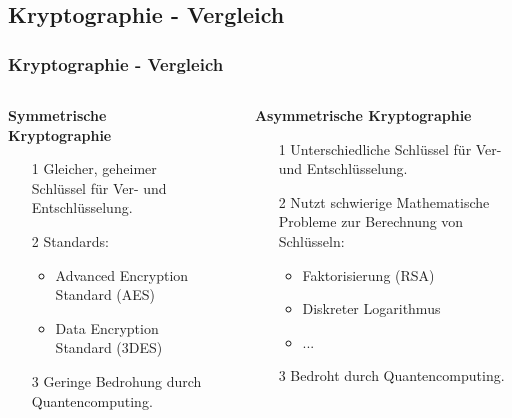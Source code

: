 \documentclass{beamer}
\begin{document}
\subsection{Kryptographie - Vergleich}
\begin{frame}
\frametitle{Kryptographie - Vergleich}

\begin{columns}[T] %

\begin{column}{.48\textwidth} %
\textbf{Symmetrische Kryptographie}
\begin{enumerate}
    \item[1] Gleicher, geheimer Schlüssel für Ver- und Entschlüsselung.
    \newline
    \item[2]  Standards:
    \begin{itemize}
        \item Advanced Encryption Standard (AES)
        \item Data Encryption Standard (3DES)
    \end{itemize}
    \item[]
    \item[3] Geringe Bedrohung durch Quantencomputing.
\end{enumerate}
\end{column}%

\begin{column}{.04\textwidth} %
\centering
\rule{1pt}{0.7\textheight} %
\end{column}

\begin{column}{.48\textwidth} %
\textbf{Asymmetrische Kryptographie}
\begin{enumerate}
    \item[1] Unterschiedliche Schlüssel für Ver- und Entschlüsselung.
    \newline
    \item[2]  Nutzt schwierige Mathematische Probleme zur Berechnung von Schlüsseln:
    \begin{itemize}
        \item Faktorisierung (RSA)
        \item Diskreter Logarithmus
        \item ...
    \end{itemize}
    \item[3] Bedroht durch Quantencomputing.
\end{enumerate}
\end{column}%

\end{columns}

\end{frame}
\end{document}
